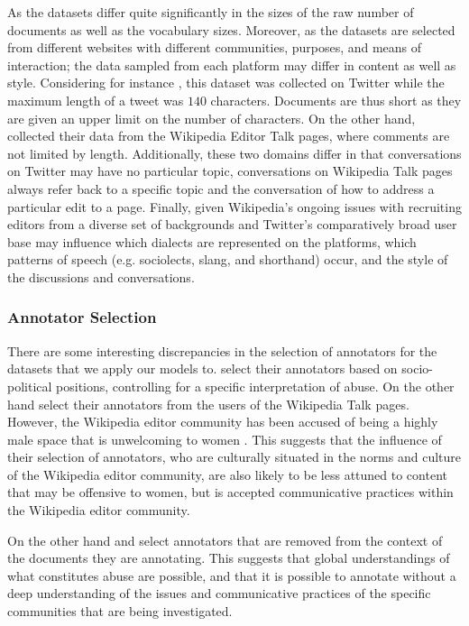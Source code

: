 As the datasets differ quite significantly in the sizes of the raw number of documents as well as the vocabulary sizes. Moreover, as the datasets are selected from different websites with different communities, purposes, and means of interaction; the data sampled from each platform may differ in content as well as style. Considering for instance \citet{Waseem:2016}, this dataset was collected on Twitter while the maximum length of a tweet was $140$ characters. Documents are thus short as they are given an upper limit on the number of characters. On the other hand, \citet{Wulczyn:2017} collected their data from the Wikipedia Editor Talk pages, where comments are not limited by length. Additionally, these two domains differ in that conversations on Twitter may have no particular topic, conversations on Wikipedia Talk pages always refer back to a specific topic and the conversation of how to address a particular edit to a page. Finally, given Wikipedia's ongoing issues with recruiting editors from a diverse set of backgrounds \cite{CITE: Wikipedia editors issue} and Twitter's comparatively broad user base \cite{CITE: Twitter userbase by demographic ref} may influence which dialects are represented on the platforms, which patterns of speech (e.g. sociolects, slang, and shorthand) occur, and the style of the discussions and conversations.

\subsubsection{Annotator Selection}

There are some interesting discrepancies in the selection of annotators for the datasets that we apply our models to. \citet{Waseem:2016} select their annotators based on socio-political positions, controlling for a specific interpretation of abuse. On the other hand \citet{Wulczyn:2017} select their annotators from the users of the Wikipedia Talk pages. However, the Wikipedia editor community has been accused of being a highly male space that is unwelcoming to women \cite{CITE: Cite article talking about anti-women culture on wikipedia}. This suggests that the influence of their selection of annotators, who are culturally situated in the norms and culture of the Wikipedia editor community, are also likely to be less attuned to content that may be offensive to women, but is accepted communicative practices within the Wikipedia editor community.

On the other hand \citet{Garcia:2019} and \citet{Davidson:2017} select annotators that are removed from the context of the documents they are annotating. This suggests that global understandings of what constitutes abuse are possible, and that it is possible to annotate without a deep understanding of the issues and communicative practices of the specific communities that are being investigated.

